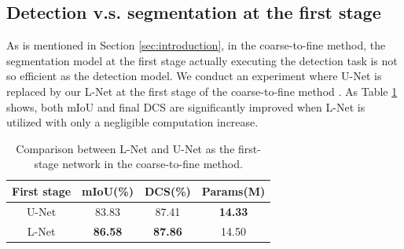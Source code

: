 \documentclass{article}
\begin{document}

\vspace{-10pt}
\subsection{Detection v.s. segmentation at the first stage}
\vspace{-5pt}
As is mentioned in Section \ref{sec:introduction}, in the coarse-to-fine method, the segmentation model at the first stage actually executing the detection task is not so efficient as the detection model. We conduct an experiment where U-Net is replaced by our L-Net at the first stage of the coarse-to-fine method \cite{zhou2017fixed,3dc2f}. As Table \ref{tab:landu} shows, both mIoU and final DCS are significantly improved when L-Net is utilized with only a negligible computation increase. %
\begin{table}[ht]
\centering \vspace{-5pt}
\caption{Comparison between L-Net and U-Net as the first-stage network in the coarse-to-fine method.} %
\vspace{-8pt}
\label{tab:landu}
\setlength{\tabcolsep}{2mm}
\begin{tabular}{cccc}  
\hline\noalign{\smallskip}
First stage    & mIoU(\%) & DCS(\%) & Params(M)\\ 
\hline
U-Net & 83.83 &  87.41 & \textbf{14.33}\\
L-Net & \textbf{86.58} &  \textbf{87.86} & 14.50\\
\hline
\end{tabular}
\end{table}
\vspace{-20pt}
\end{document}
